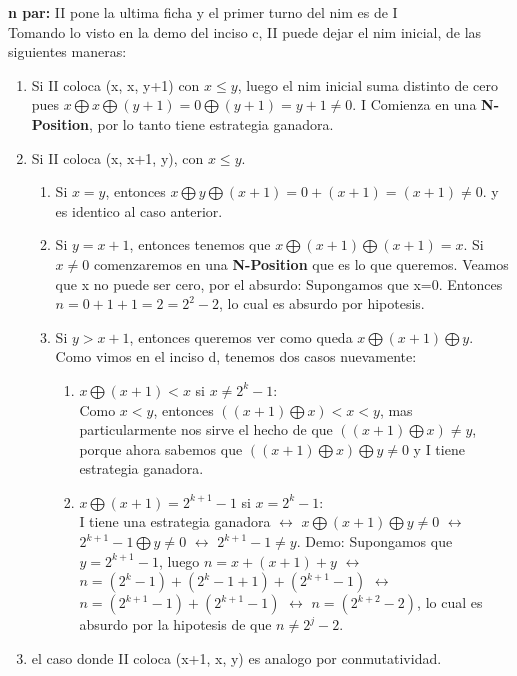 \textbf{n par:} II pone la ultima ficha y el primer turno del nim es de I\\
Tomando lo visto en la demo del inciso c, II puede dejar el nim inicial, de las siguientes maneras:
\begin{enumerate}
	\item Si II coloca (x, x, y+1) con $x \leq y$, luego el nim inicial suma distinto de cero pues $x \bigoplus x \bigoplus (y+1) = 0 \bigoplus (y+1) = y+1 \neq 0$. I Comienza en una \textbf{N-Position}, por lo tanto tiene estrategia ganadora.

	\item Si II coloca (x, x+1, y), con $x \leq y$.
		\begin{enumerate}
			\item Si $x = y$, entonces $ x \bigoplus y \bigoplus (x+1)= 0 + (x+1) = (x+1) \neq 0$. y es identico al caso anterior.
			\item Si $ y = x+1$, entonces tenemos que $ x \bigoplus (x+1) \bigoplus (x+1) = x$. Si $x \neq 0$ comenzaremos en una \textbf{N-Position} que es lo que queremos. Veamos que x no puede ser cero, por el absurdo: Supongamos que x=0. Entonces $n = 0 + 1 + 1 = 2 = 2^2 - 2$, lo cual es absurdo por hipotesis.  
			\item Si $ y > x+1$, entonces queremos ver como queda $x \bigoplus (x+1) \bigoplus y$.
			 Como vimos en el inciso d, tenemos dos casos nuevamente:
			 \begin{enumerate}
				 \item $x \bigoplus (x+1) < x$ si $x \neq 2^k -1$:\\
				 Como $x < y$, entonces $((x+1) \bigoplus x )< x < y$, mas particularmente nos sirve el hecho de que $((x+1) \bigoplus x ) \neq y$, porque ahora sabemos que $((x+1) \bigoplus x )\bigoplus y\neq 0$ y I tiene estrategia ganadora.
				 \item $x \bigoplus (x+1) = 2^{k+1} -1$ si $x = 2^k -1$:\\
				 I tiene una estrategia ganadora $\leftrightarrow$ $x \bigoplus (x+1) \bigoplus y \neq 0$ $\leftrightarrow$ $2^{k+1}-1 \bigoplus y \neq 0 $ $\leftrightarrow$ $2^{k+1}-1 \neq y $. Demo: Supongamos que $y = 2^{k+1}-1$, luego $n = x + (x+1) + y$ $\leftrightarrow$ $n = (2^k -1) + (2^k -1 +1) + (2^{k+1}-1)$ $\leftrightarrow$ $n = (2^{k+1} -1) + (2^{k+1}-1)$ $\leftrightarrow$ $n = (2^{k+2}-2)$, lo cual es absurdo por la hipotesis de que $n \neq 2^j -2$. 

			 \end{enumerate}
		\end{enumerate}
	\item el caso donde II coloca (x+1, x, y) es analogo por conmutatividad.
\end{enumerate}